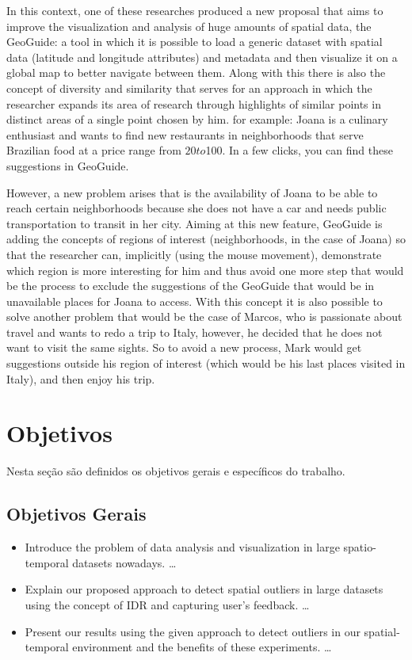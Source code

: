 In this context, one of these researches produced a new proposal that aims to 
improve the visualization and analysis of huge amounts of spatial data, the 
GeoGuide: a tool in which it is possible to load a generic dataset with spatial 
data (latitude and longitude attributes) and metadata and then visualize it on a 
global map to better navigate between them. Along with this there is also the 
concept of diversity and similarity that serves for an approach in which the
researcher expands its area of research through highlights of similar points in 
distinct areas of a single point chosen by him. for example: Joana is a culinary
enthusiast and wants to find new restaurants in neighborhoods that serve Brazilian
food at a price range from $20 to $100. In a few clicks, you can find these 
suggestions in GeoGuide.

However, a new problem arises that is the availability of Joana to be able to 
reach certain neighborhoods because she does not have a car and needs public 
transportation to transit in her city. Aiming at this new feature, GeoGuide is 
adding the concepts of regions of interest (neighborhoods, in the case of Joana) 
so that the researcher can, implicitly (using the mouse movement), demonstrate 
which region is more interesting for him and thus avoid one more step that would 
be the process to exclude the suggestions of the GeoGuide that would be in unavailable
places for Joana to access. With this concept it is also possible to solve another
problem that would be the case of Marcos, who is passionate about travel and wants
to redo a trip to Italy, however, he decided that he does not want to visit the 
same sights. So to avoid a new process, Mark would get suggestions outside his 
region of interest (which would be his last places visited in Italy), and then 
enjoy his trip.


\section{Objetivos}

Nesta seção são definidos os objetivos gerais e específicos do trabalho.

\subsection{Objetivos Gerais}

\begin{itemize}
  \item 
    Introduce the problem of data analysis and visualization in large spatio-temporal
    datasets nowadays.
  \ldots  
  \item 
    Explain our proposed approach to detect spatial outliers in large datasets using
    the concept of IDR and capturing user's feedback.
  \ldots
  \item 
    Present our results using the given approach to detect outliers in our spatial-temporal
    environment and the benefits of these experiments.
  \ldots

\end{itemize}


